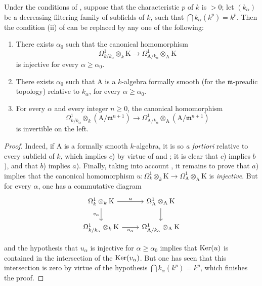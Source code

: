 \begin{proposition}[22.2.8]
\label{0.22.2.8}
Under the conditions of , suppose that the characteristic $p$ of $k$ is $>0$; let $(k_\alpha)$ be a decreasing filtering family of subfields of $k$, such that $\bigcap k_\alpha(k^p)=k^p$.
Then the condition (ii) of  can be replaced by any one of the following:
\begin{enumerate}
  \item[a)] There exists $\alpha_0$ such that the canonical homomorphism
  \[
    \Omega^1_{k/k_\alpha}\otimes_k\mathrm{K}\to\Omega^1_{\mathrm{A}/k_\alpha}\otimes_\mathrm{A}\mathrm{K}
  \]
  is injective for every $\alpha\geq\alpha_0$.
  \item[b)] There exists $\alpha_0$ such that $\mathrm{A}$ is a $k$-algebra formally smooth (for the $\mathfrak{m}$-preadic topology) relative to $k_\alpha$, for every $\alpha\geq\alpha_0$.
  \item[c)] For every $\alpha$ and every integer $n\geq 0$, the canonical homomorphism
  \[
    \Omega^1_{k/k_\alpha}\otimes_k(\mathrm{A}/\mathfrak{m}^{n+1})\to\Omega^1_{\mathrm{A}/k_\alpha}\otimes_\mathrm{A}(\mathrm{A}/\mathfrak{m}^{n+1})
  \]
  is invertible on the left.
\end{enumerate}
\end{proposition}

\begin{proof}
Indeed, if $\mathrm{A}$ is a formally smooth $k$-algebra, it is so \emph{a fortiori} relative to every subfield of $k$, which implies $c$) by virtue of  and ; it is clear that $c$) implies $b$), and that $b$) implies $a$).
Finally, taking into account , it remains to prove that $a$) implies that the canonical homomorphism $u:\Omega^1_k\otimes_k\mathrm{K}\to\Omega^1_\mathrm{A}\otimes_\mathrm{A}\mathrm{K}$ is \emph{injective}.
But for every $\alpha$, one has a commutative diagram
\[
  \begin{tikzcd}
    \Omega^1_k\otimes_k\mathrm{K} \ar[r,"u"] \ar[d,"v_\alpha"'] & \Omega^1_\mathrm{A}\otimes_\mathrm{A}\mathrm{K} \ar[d]\\
    \Omega^1_{k/k_\alpha}\otimes_k\mathrm{K} \ar[r,"u_\alpha"'] & \Omega^1_{\mathrm{A}/k_\alpha}\otimes_\mathrm{A}\mathrm{K}
  \end{tikzcd}
\]


and the hypothesis that $u_\alpha$ is injective for $\alpha\geq\alpha_0$ implies that $\operatorname{Ker}(u)$ is contained in the intersection of the $\operatorname{Ker}(v_\alpha)$.
But one has seen  that this intersection is zero by virtue of the hypothesis $\bigcap k_\alpha(k^p)=k^p$, which finishes the proof.
\end{proof}

